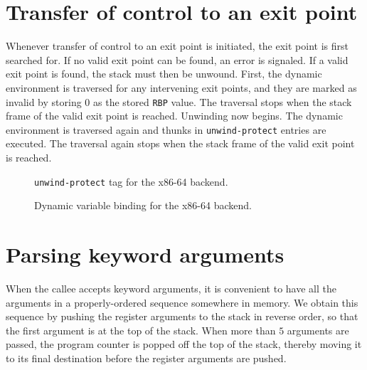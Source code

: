 \section{Transfer of control to an exit point}

Whenever transfer of control to an exit point is initiated, the exit
point is first searched for.  If no valid exit point can be found, an
error is signaled.  If a valid exit point is found, the stack must
then be unwound.  First, the dynamic environment is traversed for any
intervening exit points, and they are marked as invalid by storing 0
as the stored \texttt{RBP} value.  The traversal stops when the stack
frame of the valid exit point is reached.  Unwinding now begins.  The
dynamic environment is traversed again and thunks in
\texttt{unwind-protect} entries are executed.  The traversal again
stops when the stack frame of the valid exit point is reached.

\begin{figure}
\begin{center}
\end{center}
\caption{\label{fig-x86-64-unwind-protect}
\texttt{unwind-protect} tag for the x86-64 backend.}
\end{figure}

\begin{figure}
\begin{center}
\end{center}
\caption{\label{fig-x86-64-dynamic-binding}
Dynamic variable binding for the x86-64 backend.}
\end{figure}

\section{Parsing keyword arguments}

When the callee accepts keyword arguments, it is convenient to have
all the arguments in a properly-ordered sequence somewhere in memory.
We obtain this sequence by pushing the register arguments to the stack
in reverse order, so that the first argument is at the top of the
stack.  When more than $5$ arguments are passed, the program counter
is popped off the top of the stack, thereby moving it to its final
destination before the register arguments are pushed.

